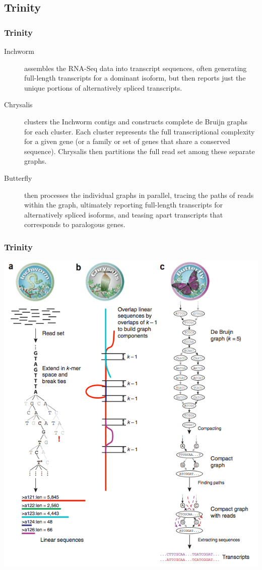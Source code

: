 \documentclass[pdf]{beamer}
\begin{document}
\subsection{Trinity}

\begin{frame}
  \frametitle{Trinity}
  \begin{description}
    \item [Inchworm] assembles the RNA-Seq data into transcript sequences, often generating full-length transcripts for a dominant isoform, but then reports just the unique portions of alternatively spliced transcripts.
    \item [Chrysalis] clusters the Inchworm contigs and constructs complete de Bruijn graphs for each cluster. Each cluster represents the full transcriptional complexity for a given gene (or a family or set of genes that share a conserved sequence). Chrysalis then partitions the full read set among these separate graphs.
    \item [Butterfly] then processes the individual graphs in parallel, tracing the paths of reads within the graph, ultimately reporting full-length transcripts for alternatively spliced isoforms, and teasing apart transcripts that corresponds to paralogous genes.
  \end{description}
\end{frame}

\begin{frame}
  \frametitle{Trinity}
  \begin{center}
  \includegraphics[scale=.25]{Figures/trinity.png} 
  \end{center}
\end{frame}
\end{document}
